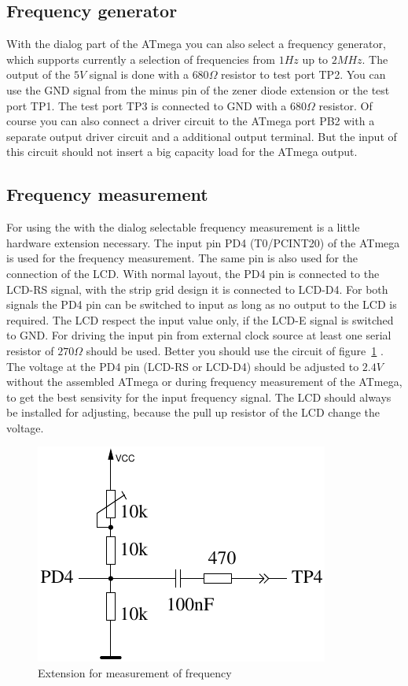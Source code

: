 \subsection{Frequency generator}

With the dialog part of the ATmega you can also select a frequency generator, which supports
currently a selection of frequencies from \(1Hz\) up to \(2MHz\).
The output of the \(5V\) signal is done with a \(680\Omega\) resistor to test port TP2.
You can use the GND signal from the minus pin of the zener diode extension or the test port TP1.
The test port TP3 is connected to GND with a \(680\Omega\) resistor.
Of course you can also connect a driver circuit to the ATmega port PB2 with a separate output
driver circuit and a additional output terminal. But the input of this circuit should not insert a
big capacity load for the ATmega output.

\subsection{Frequency measurement}
\label{sec:frequency_counter}

For using the with the dialog selectable frequency measurement is a little hardware extension
necessary. The input pin PD4 (T0/PCINT20) of the ATmega is used for the frequency measurement.
The same pin is also used for the connection of the LCD. With normal layout, the PD4 pin is connected
to the LCD-RS signal, with the strip grid design it is connected to LCD-D4.
For both signals the PD4 pin can be switched to input as long as no output to the LCD is
required. The LCD respect the input value only, if the LCD-E signal is switched to GND.
For driving the input pin from external clock source at least one serial resistor of \(270\Omega\) should be used.
Better you should use the circuit of figure~\ref{fig:FreqMes} .
The voltage at the PD4 pin (LCD-RS or LCD-D4) should be adjusted to \(2.4V\) without the assembled ATmega
or during frequency measurement of the ATmega, to get the best sensivity for the input frequency signal.
The LCD should always be installed for adjusting, because the pull up resistor of the LCD change the voltage.

\begin{figure}[H]
\centering
\includegraphics[width=.4\textwidth]{../FIG/Frequency_addon.pdf}
\caption{Extension for measurement of frequency}
\label{fig:FreqMes}
\end{figure}

